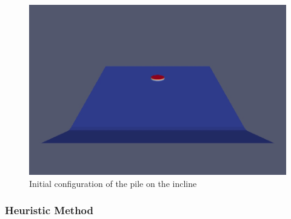 \documentclass[letterpaper,10pt]{article}
\begin{document}
\begin{figure}[H]
\label{initpile}
\begin{center}
\includegraphics[width=.7\textwidth]{IMAGES/initialconf.jpg}
\caption{Initial configuration of the pile on the incline}
\end{center}
\end{figure}

\subsubsection{Heuristic Method}
\end{document}
